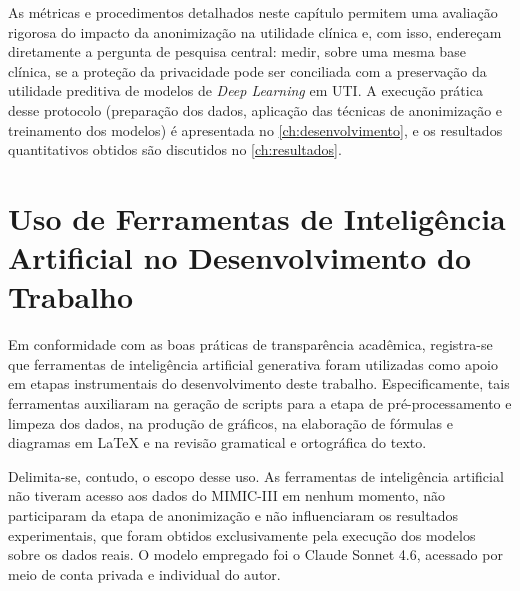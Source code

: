 As métricas e procedimentos detalhados neste capítulo permitem uma avaliação rigorosa do impacto da anonimização na utilidade clínica e, com isso, endereçam diretamente a pergunta de pesquisa central: medir, sobre uma mesma base clínica, se a proteção da privacidade pode ser conciliada com a preservação da utilidade preditiva de modelos de \textit{Deep Learning} em UTI. A execução prática desse protocolo (preparação dos dados, aplicação das técnicas de anonimização e treinamento dos modelos) é apresentada no \autoref{ch:desenvolvimento}, e os resultados quantitativos obtidos são discutidos no \autoref{ch:resultados}.

\section{Uso de Ferramentas de Inteligência Artificial no Desenvolvimento do Trabalho}
\label{sec:metod-uso-ia}

Em conformidade com as boas práticas de transparência acadêmica, registra-se que ferramentas de inteligência artificial generativa foram utilizadas como apoio em etapas instrumentais do desenvolvimento deste trabalho. Especificamente, tais ferramentas auxiliaram na geração de scripts para a etapa de pré-processamento e limpeza dos dados, na produção de gráficos, na elaboração de fórmulas e diagramas em \LaTeX{} e na revisão gramatical e ortográfica do texto.

Delimita-se, contudo, o escopo desse uso. As ferramentas de inteligência artificial não tiveram acesso aos dados do MIMIC-III em nenhum momento, não participaram da etapa de anonimização e não influenciaram os resultados experimentais, que foram obtidos exclusivamente pela execução dos modelos sobre os dados reais. O modelo empregado foi o Claude Sonnet 4.6, acessado por meio de conta privada e individual do autor.